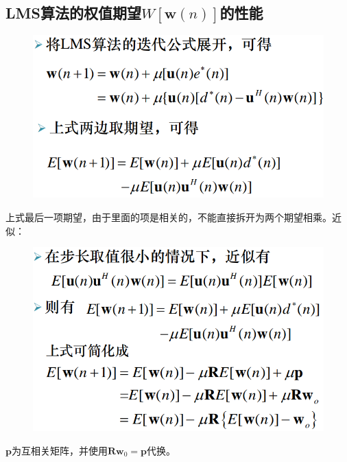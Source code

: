 \documentclass[UTF8]{ctexart} %
\begin{document}
		\subsection{LMS算法的权值期望$W[\bm{w}(n)]$的性能}
			\begin{figure}[H]
				\centering\includegraphics[scale=0.4]{34.png}
			\end{figure}
			上式最后一项期望，由于里面的项是相关的，不能直接拆开为两个期望相乘。近似：
			\begin{figure}[H]
				\centering\includegraphics[scale=0.4]{35.png}
			\end{figure}
			$\bm{p}$为互相关矩阵，并使用$\bm{Rw}_0=\bm{p}$代换。
			
\end{document}
